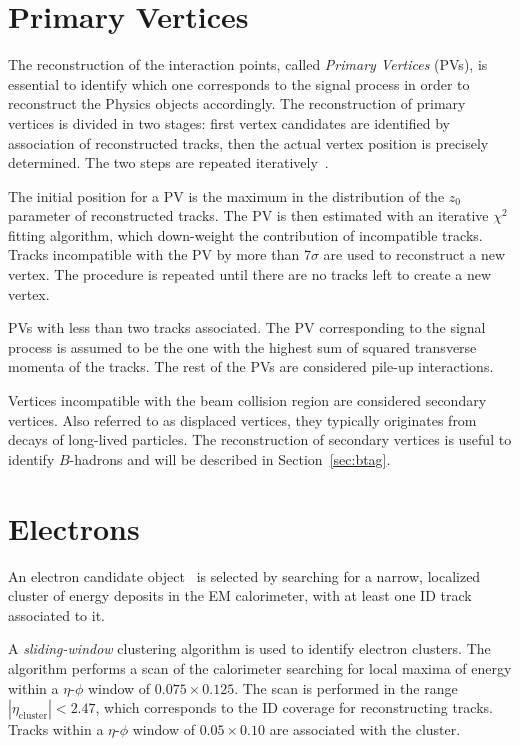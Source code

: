 \section{Primary Vertices}
\label{sec:pv}


The reconstruction of the interaction points, called {\it Primary
  Vertices} (PVs), is essential to identify which one corresponds to the signal
process in order to reconstruct the Physics objects accordingly.
The reconstruction of primary vertices is divided in two stages: first
vertex candidates are identified by association of reconstructed
tracks, then the actual vertex position is precisely determined.
The two steps are repeated iteratively~\cite{vertexalgo}.

The initial position for a PV is the maximum in the distribution of
the $z_0$ parameter of reconstructed tracks. The PV is then
estimated with an iterative $\chi^2$ fitting algorithm, which
down-weight the contribution of incompatible tracks. Tracks
incompatible with the PV by more than 7$\sigma$ are used to
reconstruct a new vertex. The procedure is repeated until there are no
tracks left to create a new vertex.

PVs with less than two tracks associated. The PV
corresponding to the signal process is assumed to be the one with
the highest sum of squared transverse momenta of the tracks. The rest
of the PVs are considered pile-up interactions.

Vertices incompatible with the beam collision region are considered
secondary vertices.
Also referred to as displaced vertices, they typically originates from
decays of long-lived particles.
The reconstruction of secondary vertices is useful to identify
$B$-hadrons and will be described in Section~\ref{sec:btag}.

\section{Electrons}
\label{sec:electrons}

An electron candidate object~\cite{elereco} is selected by searching 
for a narrow, 
localized cluster of energy deposits in the EM calorimeter, 
with at least one ID track associated to it.

A {\it sliding-window} clustering algorithm is used to identify electron 
clusters. The algorithm performs a scan of the calorimeter searching 
for local maxima of energy
within a $\eta$-$\phi$ window of $0.075\times{}0.125$.
The scan is performed in the range $|\eta_{\mathrm{cluster}}|<2.47$, 
which corresponds to the ID coverage for reconstructing tracks. 
Tracks within a $\eta$-$\phi$ window of $0.05\times{}0.10$ are 
associated with the cluster.

